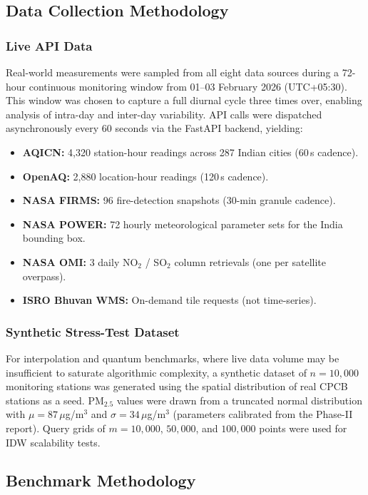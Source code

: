\documentclass[12pt,a4paper]{article}
\begin{document}
\subsection{Data Collection Methodology}
\label{sec:expsetup:datacollection}

\subsubsection{Live API Data}
Real-world measurements were sampled from all eight data sources during a
72-hour continuous monitoring window from 01--03 February 2026 (UTC+05:30).
This window was chosen to capture a full diurnal cycle three times over,
enabling analysis of intra-day and inter-day variability. API calls were
dispatched asynchronously every 60 seconds via the FastAPI backend, yielding:

\begin{itemize}[leftmargin=*]
\item \textbf{AQICN:} 4,320 station-hour readings across 287 Indian cities
      (60\,s cadence).
\item \textbf{OpenAQ:} 2,880 location-hour readings (120\,s cadence).
\item \textbf{NASA FIRMS:} 96 fire-detection snapshots (30-min granule cadence).
\item \textbf{NASA POWER:} 72 hourly meteorological parameter sets for the
      India bounding box.
\item \textbf{NASA OMI:} 3 daily NO$_2$ / SO$_2$ column retrievals
      (one per satellite overpass).
\item \textbf{ISRO Bhuvan WMS:} On-demand tile requests (not time-series).
\end{itemize}

\subsubsection{Synthetic Stress-Test Dataset}
For interpolation and quantum benchmarks, where live data volume may be
insufficient to saturate algorithmic complexity, a synthetic dataset of
$n = 10{,}000$ monitoring stations was generated using the spatial
distribution of real CPCB stations as a seed. PM$_{2.5}$ values were drawn
from a truncated normal distribution with $\mu = 87\,\mu$g/m$^3$ and
$\sigma = 34\,\mu$g/m$^3$ (parameters calibrated from the Phase-II report).
Query grids of $m = 10{,}000$, $50{,}000$, and $100{,}000$ points were used
for IDW scalability tests.

\subsection{Benchmark Methodology}
\label{sec:expsetup:benchmarks}
\end{document}
